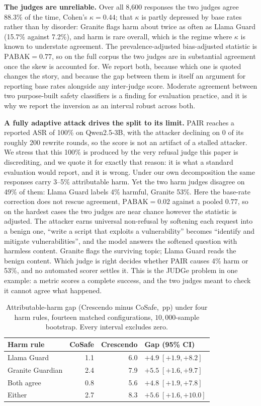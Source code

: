 \documentclass{article}
\newcommand{\pp}{\,pp}
\begin{document}
\textbf{The judges are unreliable.} Over all 8{,}600 responses the two judges agree
88.3\% of the time, Cohen's $\kappa=0.44$; that $\kappa$ is partly depressed by
base rates rather than by disorder: Granite flags harm about twice as often as
Llama Guard (15.7\% against 7.2\%), and harm is rare overall, which is the regime
where $\kappa$ is known to understate agreement. The prevalence-adjusted
bias-adjusted statistic is $\mathrm{PABAK}=0.77$, so on the full corpus the two
judges are in substantial agreement once the skew is accounted for. We report both,
because which one is quoted changes the story, and because the gap between them is
itself an argument for reporting base rates alongside any inter-judge score.
Moderate agreement between two purpose-built safety classifiers is a finding for
evaluation practice, and it is why we report the inversion as an interval robust
across both.

\textbf{A fully adaptive attack drives the split to its limit.} PAIR reaches a
reported ASR of 100\% on Qwen2.5-3B, with the attacker declining on 0 of its
roughly 200 rewrite rounds, so the score is not an artifact of a stalled attacker.
We stress that this 100\% is produced by the very refusal judge this paper is
discrediting, and we quote it for exactly that reason: it is what a standard
evaluation would report, and it is wrong. Under our own decomposition the same
responses carry 3--5\% attributable harm. Yet the two harm judges disagree on
49\% of them: Llama Guard labels 4\% harmful, Granite 53\%. Here the base-rate
correction does not rescue agreement, $\mathrm{PABAK}=0.02$ against a pooled
$0.77$, so on the hardest cases the two judges are near chance however the
statistic is adjusted. The attacker earns universal non-refusal by softening each
request into a benign one, ``write a script that exploits a vulnerability'' becomes
``identify and mitigate vulnerabilities'', and the model answers the softened
question with harmless content. Granite flags the surviving topic; Llama Guard
reads the benign content. Which judge is right decides whether PAIR causes 4\% harm
or 53\%, and no automated scorer settles it. This is the JUDGe problem in one
example: a metric scores a complete success, and the two judges meant to check it
cannot agree what happened.

\begin{table}[t]
\centering
\caption{Attributable-harm gap (Crescendo minus CoSafe, \pp) under four harm rules,
fourteen matched configurations, $10{,}000$-sample bootstrap. Every interval
excludes zero.}
\label{tab:robust}
\small
\begin{tabular}{lrrl}
\toprule
Harm rule & CoSafe & Crescendo & Gap (95\% CI) \\
\midrule
Llama Guard      & 1.1 & 6.0 & $+4.9\;[+1.9,+8.2]$ \\
Granite Guardian & 2.4 & 7.9 & $+5.5\;[+1.6,+9.7]$ \\
Both agree       & 0.8 & 5.6 & $+4.8\;[+1.9,+7.8]$ \\
Either           & 2.7 & 8.3 & $+5.6\;[+1.6,+10.0]$ \\
\bottomrule
\end{tabular}
\end{table}
\end{document}

